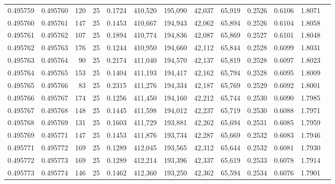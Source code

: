 \begin{tabular}{rrrrrrrrrrrrr}
0.495759 & 0.495760 &   120 &  25 &                                     0.1724 & 410,520 & 195,090 &  42,037 &  65,919 & 0.2526 & 0.6106 & 1.8071 \\
0.495760 & 0.495761 &   147 &  25 &                                     0.1453 & 410,667 & 194,943 &  42,062 &  65,894 & 0.2526 & 0.6104 & 1.8058 \\
0.495761 & 0.495762 &   107 &  25 &                                     0.1894 & 410,774 & 194,836 &  42,087 &  65,869 & 0.2527 & 0.6101 & 1.8048 \\
0.495762 & 0.495763 &   176 &  25 &                                     0.1244 & 410,950 & 194,660 &  42,112 &  65,844 & 0.2528 & 0.6099 & 1.8031 \\
0.495763 & 0.495764 &    90 &  25 &                                     0.2174 & 411,040 & 194,570 &  42,137 &  65,819 & 0.2528 & 0.6097 & 1.8023 \\
0.495764 & 0.495765 &   153 &  25 &                                     0.1404 & 411,193 & 194,417 &  42,162 &  65,794 & 0.2528 & 0.6095 & 1.8009 \\
0.495765 & 0.495766 &    83 &  25 &                                     0.2315 & 411,276 & 194,334 &  42,187 &  65,769 & 0.2529 & 0.6092 & 1.8001 \\
0.495766 & 0.495767 &   174 &  25 &                                     0.1256 & 411,450 & 194,160 &  42,212 &  65,744 & 0.2530 & 0.6090 & 1.7985 \\
0.495767 & 0.495768 &   148 &  25 &                                     0.1445 & 411,598 & 194,012 &  42,237 &  65,719 & 0.2530 & 0.6088 & 1.7971 \\
0.495768 & 0.495769 &   131 &  25 &                                     0.1603 & 411,729 & 193,881 &  42,262 &  65,694 & 0.2531 & 0.6085 & 1.7959 \\
0.495769 & 0.495771 &   147 &  25 &                                     0.1453 & 411,876 & 193,734 &  42,287 &  65,669 & 0.2532 & 0.6083 & 1.7946 \\
0.495771 & 0.495772 &   169 &  25 &                                     0.1289 & 412,045 & 193,565 &  42,312 &  65,644 & 0.2532 & 0.6081 & 1.7930 \\
0.495772 & 0.495773 &   169 &  25 &                                     0.1289 & 412,214 & 193,396 &  42,337 &  65,619 & 0.2533 & 0.6078 & 1.7914 \\
0.495773 & 0.495774 &   146 &  25 &                                     0.1462 & 412,360 & 193,250 &  42,362 &  65,594 & 0.2534 & 0.6076 & 1.7901 \\

\end{tabular}
